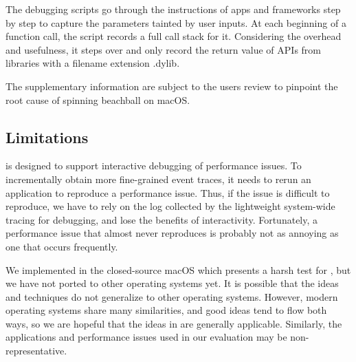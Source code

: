 The debugging scripts go through the instructions of apps and frameworks step
by step to capture the parameters tainted by user inputs. At each beginning of
a function call, the script records a full call stack for it. Considering the
overhead and usefulness, it steps over and only record the return value of APIs
from libraries with a filename extension .dylib.

The supplementary information are subject to the users review to pinpoint the
root cause of spinning beachball on macOS.

\subsection{Limitations}
\xxx is designed to support interactive debugging of performance issues. To
incrementally obtain more fine-grained event traces, it needs to rerun an
application to reproduce a performance issue. Thus, if the issue is difficult to
reproduce, we have to rely on the log collected by the lightweight system-wide
tracing for debugging, and lose the benefits of interactivity. Fortunately, a
performance issue that almost never reproduces is probably not as annoying as
one that occurs frequently.

We implemented \xxx in the closed-source macOS which presents a harsh test
for \xxx, but we have not ported \xxx to other operating systems yet. It is
possible that the ideas and techniques do not generalize to other operating
systems. However, modern operating systems share many similarities, and good
ideas tend to flow both ways, so we are hopeful that the ideas in \xxx are
generally applicable. Similarly, the applications and performance issues used in
our evaluation may be non-representative.
